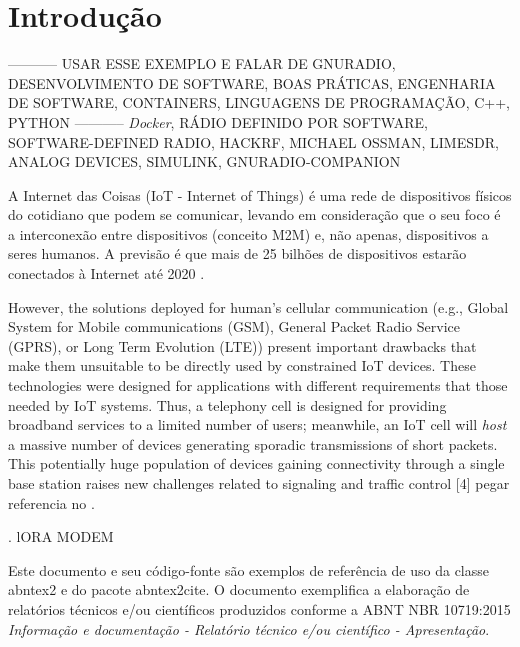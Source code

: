 \documentclass[
  12pt,				%
  openright,			%
  twoside,			%
  a4paper,			%
  english,			%
  french,				%
  spanish,			%
  brazil,				%
  ]{abntex2}
\begin{document}
\tableofcontents*
\cleardoublepage


\textual

\chapter*[Introdução]{Introdução}

----------- USAR ESSE EXEMPLO E FALAR DE GNURADIO, DESENVOLVIMENTO DE SOFTWARE, BOAS PRÁTICAS, ENGENHARIA DE SOFTWARE, CONTAINERS, LINGUAGENS DE PROGRAMAÇÃO, C++, PYTHON
----------- \textit{Docker}, RÁDIO DEFINIDO POR SOFTWARE, SOFTWARE-DEFINED RADIO, HACKRF, MICHAEL OSSMAN, LIMESDR, ANALOG DEVICES, SIMULINK, GNURADIO-COMPANION

A Internet das Coisas (IoT - Internet of Things) é uma rede de dispositivos físicos do cotidiano que podem se comunicar, levando em consideração que o seu foco é a interconexão entre dispositivos (conceito M2M) e, não apenas, dispositivos a seres humanos. A previsão é que mais de 25 bilhões de dispositivos estarão conectados à Internet até 2020 \cite[p. 1]{sanchez2017transmission}.

However, the solutions deployed for human’s cellular communication (e.g., Global System for Mobile communications (GSM), General Packet Radio Service (GPRS), or Long Term Evolution (LTE)) present important drawbacks that make them unsuitable to be directly used by constrained IoT devices. These technologies were designed for applications with
different requirements that those needed by IoT systems. Thus, a telephony cell is designed for providing broadband services to a limited number of users; meanwhile, an IoT cell will \textit{host} a massive number of devices generating sporadic transmissions of
short packets. This potentially huge population of devices gaining connectivity through a single base station raises new challenges related to signaling and traffic control [4] pegar referencia no \cite[p. 1]{sanchez2017transmission}.

\cite[p. 1]{AN1200.13}. lORA MODEM


Este documento e seu código-fonte são exemplos de referência de uso da classe
\textsf{abntex2} e do pacote \textsf{abntex2cite}. O documento
exemplifica a elaboração de relatórios técnicos e/ou científicos produzidos
conforme a ABNT NBR 10719:2015 \emph{Informação e documentação - Relatório
  técnico e/ou científico - Apresentação}.
\end{document}
